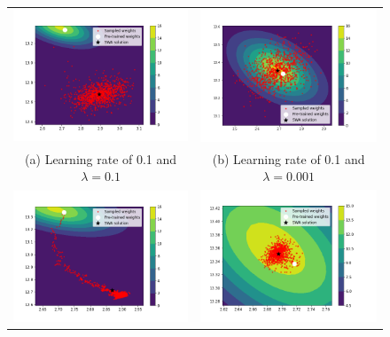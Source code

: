\documentclass[msc,deptreport.inf]{infthesis} %
\begin{document}
\begin{figure}[!htbp] 
	\begin{tabular}{cc}
		\includegraphics[width=70mm]{plots/linear_model_weight_iterates__lr=0.1__lambda=0.1.png}
		& \includegraphics[width=70mm]{plots/linear_model_weight_iterates__lr=0.1__lambda=0.001.png} \\
		(a) Learning rate of 0.1 and $\lambda = 0.1$
		 & (b) Learning rate of 0.1 and $\lambda = 0.001$ \\[6pt] 
		 \includegraphics[width=70mm]{plots/linear_model_weight_iterates__lr=0.01__lambda=0.1.png}
		 & \includegraphics[width=70mm]{plots/linear_model_weight_iterates__lr=0.01__lambda=0.001.png} \\

\end{tabular}
\end{figure}
\end{document}
